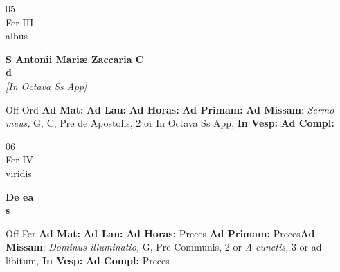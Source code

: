 \documentclass[10pt, openany]{book}
\begin{document}
        \begin{center}
            \begin{minipage}{3.5in}
                \vspace{2em}
                \begin{minipage}{0.5in}
                    {\Huge 05} \\
                    {\normalsize Fer III} \\
                    {\normalsize albus}
                \end{minipage}
                \begin{minipage}{3.0in}
                    \textbf{ \large S Antonii Mariæ Zaccaria C \\
                    \textnormal{\normalsize d}} \\ \textit{[In Octava Ss App]} \\ 
                \end{minipage}
                \begin{justify}Off Ord
                    \textbf{Ad Mat: }
                    \textbf{Ad Lau: }
                    \textbf{Ad Horas: }
                    \textbf{Ad Primam: }\textbf{Ad Missam}: \textit{Sermo meus,} G, C, Pre de Apostolis, 2 or In Octava Ss App,  
                    \textbf{In Vesp: }
                    \textbf{Ad Compl: }
                \end{justify}
            \end{minipage}
        \end{center}
    
        \begin{center}
            \begin{minipage}{3.5in}
                \vspace{2em}
                \begin{minipage}{0.5in}
                    {\Huge 06} \\
                    {\normalsize Fer IV} \\
                    {\normalsize viridis}
                \end{minipage}
                \begin{minipage}{3.0in}
                    \textbf{ \large De ea \\
                    \textnormal{\normalsize s}} \\ 
                \end{minipage}
                \begin{justify}Off Fer
                    \textbf{Ad Mat: }
                    \textbf{Ad Lau: }
                    \textbf{Ad Horas: }Preces
                    \textbf{Ad Primam: }Preces\textbf{Ad Missam}: \textit{Dominus illuminatio,} G, Pre Communis, 2 or \textit{A cunctis,} 3 or ad libitum,  
                    \textbf{In Vesp: }
                    \textbf{Ad Compl: }Preces
                \end{justify}
            \end{minipage}
        \end{center}
    
\end{document}
